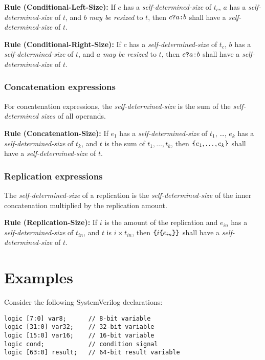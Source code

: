 \documentclass{article}
\newcommand{\sds}{\emph{self-determined-size}}
\newcommand{\mbr}{\emph{may be resized}}
\newenvironment{typingrule}[1]%
{\par\noindent\textbf{Rule (#1):} }%
{\par}
\begin{document}
\begin{typingrule}{Conditional-Left-Size}
  If $c$ has a \sds{} of $t_{c}$, $a$ has a
  \sds{} of $t$, and $b$ \mbr{} to $t$,
  then $c \verb|?| a \verb|:| b$ shall have a \sds{} of
  $t$.
\end{typingrule}

\begin{typingrule}{Conditional-Right-Size}
  If $c$ has a \sds{} of $t_{c}$, $b$ has a
  \sds{} of $t$, and $a$ \mbr{} to $t$,
  then $c \verb|?| a \verb|:| b$ shall have a \sds{} of
  $t$.
\end{typingrule}

\subsubsection{Concatenation expressions}%

For concatenation expressions, the \sds{} is the sum of the
\emph{self-determined sizes} of all operands.

\begin{typingrule}{Concatenation-Size}
  If $e_{1}$ has a \sds{} of $t_{1}$, \ldots, $e_{k}$ has a
  \sds{} of $t_{k}$, and $t$ is the sum of
  $t_{1}, \dots, t_{k}$, then $\verb|{|e_{1}, \dots, e_{k}\verb|}|$ shall have
  a \sds{} of $t$.
\end{typingrule}

\subsubsection{Replication expressions}%

The \sds{} of a replication is the
\sds{} of the inner concatenation multiplied by the
replication amount.

\begin{typingrule}{Replication-Size}
  If $i$ is the amount of the replication and $e_{in}$ has a
  \sds{} of $t_{in}$, and $t$ is $i \times t_{in}$, then
  $\verb|{| i \verb|{| e_{in}\verb|}}|$ shall have a
  \sds{} of $t$.
\end{typingrule}

\section{Examples}

Consider the following SystemVerilog declarations:

\begin{verbatim}
logic [7:0] var8;      // 8-bit variable
logic [31:0] var32;    // 32-bit variable
logic [15:0] var16;    // 16-bit variable
logic cond;            // condition signal
logic [63:0] result;   // 64-bit result variable
\end{verbatim}
\end{document}
